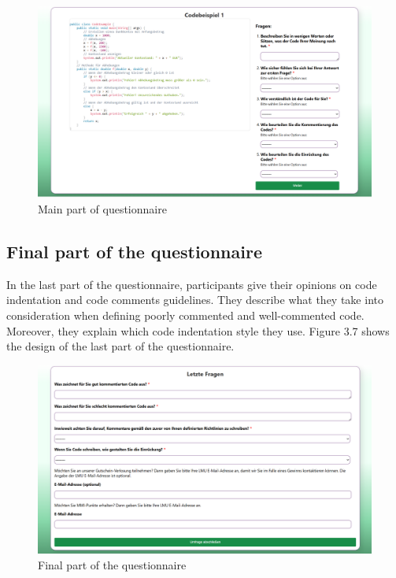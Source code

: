 \begin{figure} [H]
  \centering
  \includegraphics[scale=0.45]{figures/main_p.png}
  \caption{Main part of questionnaire}
  \label{fig:AnhangsChor}
\end{figure}



\subsection{Final part of the questionnaire}
In the last part of the questionnaire, participants give their opinions on code indentation and code comments guidelines. They describe what they take into consideration when defining poorly commented and well-commented code. Moreover, they explain which code indentation style they use.  Figure 3.7 shows the design of the last part of the questionnaire.


\begin{figure}  [H]
  \centering
  \includegraphics[scale=0.45]{figures/last_part.png}
  \caption{Final part of the questionnaire}
  \label{fig:AnhangsChor}
\end{figure}


